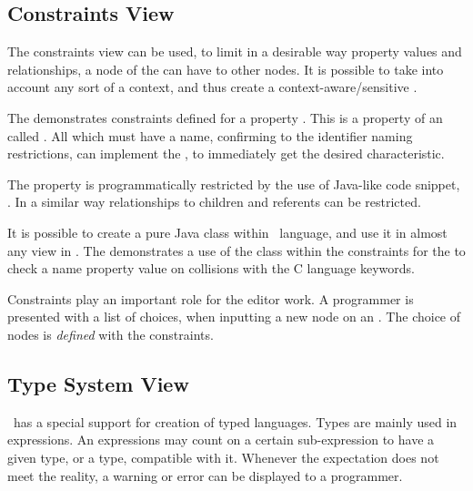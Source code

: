 \subsection{Constraints View}
\label{mpsconstraints}


The constraints view can be used, to limit in a desirable way  property values and relationships, a node of the  can 
have to other nodes. It is possible to take into account any sort of a context, and thus create a context-aware/sensitive .

The  demonstrates constraints defined for a property . This is a property of an 
 called . All  which must have a name, confirming to the identifier naming restrictions, can implement the ,
to immediately get the desired characteristic.

The  property is programmatically restricted by the use of Java-like code snippet, . In a similar way
relationships to children and referents can be restricted.

It is possible to create a pure Java class within \jbmps\ language, and use it in almost any  view in \jbmps. 
The  demonstrates a use of the  class within the constraints for the 
 to check a name property value on collisions with the C language keywords.

Constraints play an important role for the editor work. A programmer is presented with a list of choices, when inputting
a new node on an . The choice of nodes is \emph{defined} with the constraints.

\subsection{Type System View}
\label{mpsts}
\jbmps\ has a special support for creation of typed languages. Types are mainly used in expressions. An expressions may count on 
a certain sub-expression to have a given type, or a type, compatible with it. Whenever the expectation does not meet the reality,
a warning or error can be displayed to a programmer. 



